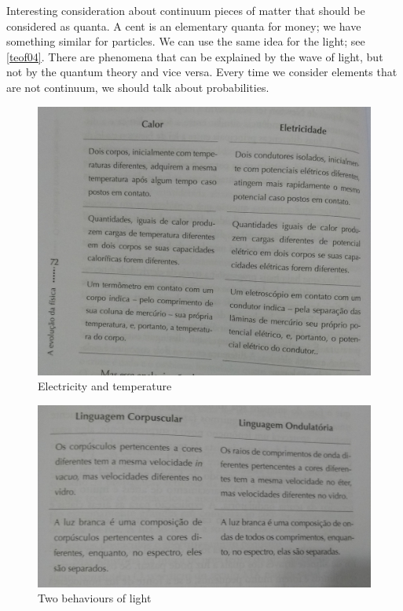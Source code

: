 \documentclass{cornell}
\begin{document}
%
{Interesting consideration about continuum pieces of matter that should be considered as quanta. A cent is an elementary quanta for money; we have something similar for particles. We can use the same idea for the light; see \ref{teof04}. There are phenomena that can be explained by the wave of light, but not by the quantum theory and vice versa. Every time we consider elements that are not continuum, we should talk about probabilities. }%


\begin{figure}[!t]
\centering
\includegraphics[width=1.0\linewidth]{images/teof01.jpg}
\caption{Electricity and temperature }
\label{teof01}
\end{figure}


\begin{figure}[!t]
\centering
\includegraphics[width=1.0\linewidth]{images/teof02.jpg}
\caption{Two behaviours of light }
\label{teof02}
\end{figure}
\end{document}
